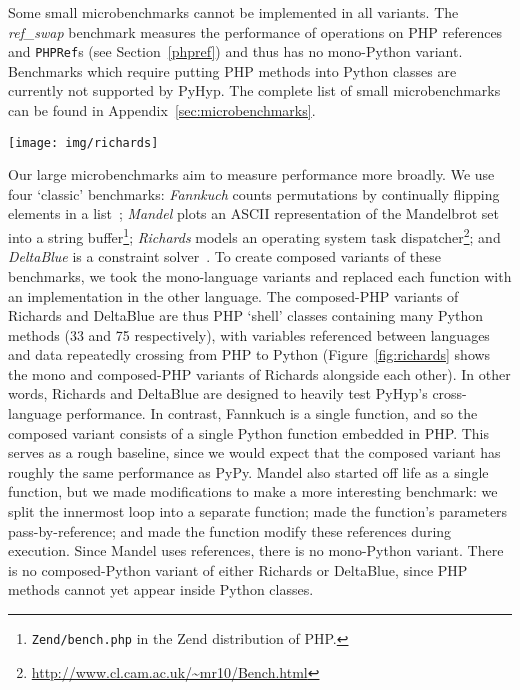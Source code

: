 \documentclass[a4paper,UKenglish]{lipics-v2016}
\newcommand{\ourvm}{PyHyp\xspace}
\newcommand{\pypy}{PyPy\xspace}
\begin{document}
Some small microbenchmarks cannot be implemented in all variants. The
\emph{ref\_swap} benchmark measures the performance of operations on PHP
references and \texttt{PHPRef}s (see Section~\ref{phpref}) and thus has no
mono-Python variant. Benchmarks which require putting PHP methods into
Python classes are currently not supported by \ourvm.
The complete list of small microbenchmarks can be found in
Appendix~\ref{sec:microbenchmarks}.

\begin{figure*}[t]
\begin{center}
\texttt{[image: img/richards]}
\end{center}
\caption{The mono-PHP and composed-PHP variants of Richards side by side.
The composed-PHP variant of the benchmark contains a `shell' PHP
program with PHP classes whose methods are Python language boxes.
Global variables remain defined in PHP, so that the benchmarks also include
an element of cross-language scoping.}
\label{fig:richards}
\end{figure*}

Our large microbenchmarks aim to measure performance more broadly.
We use four `classic' benchmarks: \emph{Fannkuch} counts permutations by
continually flipping elements in a list~\cite{anderson94fannkuch}; \emph{Mandel}
plots an ASCII representation of the Mandelbrot set into a string
buffer\footnote{\texttt{Zend/bench.php} in the Zend distribution of PHP.};
\emph{Richards} models an operating system task
dispatcher\footnote{\url{http://www.cl.cam.ac.uk/~mr10/Bench.html}}; and
\emph{DeltaBlue} is a constraint solver~\cite{sannella93deltablue}.
To create composed variants of these benchmarks, we took the
mono-language variants and replaced each function with an
implementation in the other language.
The composed-PHP variants of Richards and DeltaBlue are thus PHP
`shell' classes containing many Python methods (33 and 75
respectively), with variables referenced between languages and data
repeatedly crossing from PHP to Python (Figure~\ref{fig:richards}
shows the mono and composed-PHP variants of Richards
alongside each other). In other words, Richards and DeltaBlue
are designed to heavily test \ourvm's cross-language performance. In contrast,
Fannkuch is a single function, and so the composed variant consists of a single
Python function embedded in PHP. This serves as a rough baseline, since we would
expect that the composed variant has roughly the same performance as \pypy.
Mandel also
started off life as a single function, but we made modifications to
make a more interesting benchmark: we split the innermost loop into a
separate function; made the function's parameters pass-by-reference; and
made the
function modify these references during execution. Since Mandel uses references,
there is no mono-Python variant. There is no composed-Python
variant of either Richards or DeltaBlue, since PHP methods cannot yet appear
inside Python classes.
\end{document}
